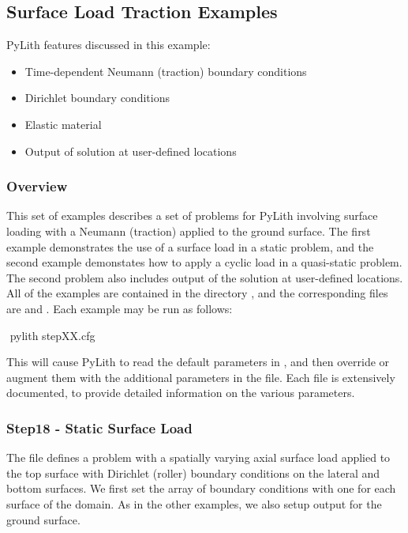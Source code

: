 \subsection{Surface Load Traction Examples}
\label{sec:example:3dhex8:surfload}

PyLith features discussed in this example:
\begin{itemize}
\item Time-dependent Neumann (traction) boundary conditions
\item Dirichlet boundary conditions
\item Elastic material
\item Output of solution at user-defined locations
\end{itemize}

\subsubsection{Overview}

This set of examples describes a set of problems for PyLith involving
surface loading with a Neumann (traction) applied to the ground surface.
The first example demonstrates the use of a surface load in a static
problem, and the second example demonstates how to apply a cyclic
load in a quasi-static problem. The second problem also includes output
of the solution at user-defined locations. All of the examples are
contained in the directory , and the corresponding
 files are  and .
Each example may be run as follows:
\begin{shell}
$$ pylith stepXX.cfg
\end{shell}
This will cause PyLith to read the default parameters in ,
and then override or augment them with the additional parameters in
the  file. Each  file is extensively
documented, to provide detailed information on the various parameters.


\subsubsection{Step18 - Static Surface Load}

The  file defines a problem with a spatially varying
axial surface load applied to the top surface with Dirichlet (roller)
boundary conditions on the lateral and bottom surfaces. We first set
the array of boundary conditions with one for each surface of the
domain. As in the other examples, we also setup output for the ground
surface.

